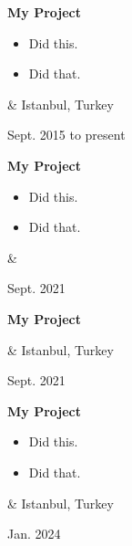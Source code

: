 \documentclass[10pt, letterpaper]{article}
\newenvironment{highlights}{
        \begin{itemize}[
                topsep=0pt,
                parsep=0.10 cm,
                partopsep=0pt,
                itemsep=0pt,
                after=\relax,
                leftmargin=0.4 cm + 3pt
            ]
    }{
        \end{itemize}
    } %
\let\originalTabularx\tabularx
\let\originalEndTabularx\endtabularx
\renewenvironment{tabularx}{\bgroup\centering\originalTabularx}{\originalEndTabularx\par\egroup}
\begin{document}
        \vspace{0.2 cm}
        \begin{tabularx}{
            \textwidth-0.4 cm-0.13cm
        }{
            K{0.2 cm}
            R{4.1 cm}
        }
            \textbf{My Project}

            \vspace{0.10 cm}

            \begin{highlights}
                \item Did this.
                \item Did that.
            \end{highlights}
            &
            Istanbul, Turkey

            Sept. 2015 to present
        \end{tabularx}


        \vspace{0.2 cm}
        \begin{tabularx}{
            \textwidth-0.4 cm-0.13cm
        }{
            K{0.2 cm}
            R{4.1 cm}
        }
            \textbf{My Project}

            \vspace{0.10 cm}

            \begin{highlights}
                \item Did this.
                \item Did that.
            \end{highlights}
            &
            

            Sept. 2021
        \end{tabularx}


        \vspace{0.2 cm}
        \begin{tabularx}{
            \textwidth-0.4 cm-0.13cm
        }{
            K{0.2 cm}
            R{4.1 cm}
        }
            \textbf{My Project}

            \vspace{0.10 cm}

            &
            Istanbul, Turkey

            Sept. 2021
        \end{tabularx}


        \vspace{0.2 cm}
        \begin{tabularx}{
            \textwidth-0.4 cm-0.13cm
        }{
            K{0.2 cm}
            R{4.1 cm}
        }
            \textbf{My Project}

            \vspace{0.10 cm}

            \begin{highlights}
                \item Did this.
                \item Did that.
            \end{highlights}
            &
            Istanbul, Turkey

            Jan. 2024
        \end{tabularx}
\end{document}
